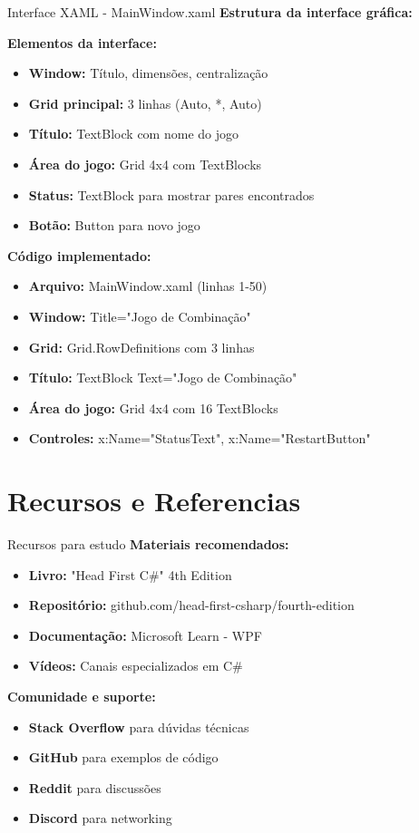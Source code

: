\documentclass[aspectratio=169]{beamer}
\begin{document}
\begin{frame}{Interface XAML - MainWindow.xaml}
\textbf{Estrutura da interface gráfica:}

\textbf{Elementos da interface:}
\begin{itemize}
    \item \textbf{Window:} Título, dimensões, centralização
    \item \textbf{Grid principal:} 3 linhas (Auto, *, Auto)
    \item \textbf{Título:} TextBlock com nome do jogo
    \item \textbf{Área do jogo:} Grid 4x4 com TextBlocks
    \item \textbf{Status:} TextBlock para mostrar pares encontrados
    \item \textbf{Botão:} Button para novo jogo
\end{itemize}

\textbf{Código implementado:}
\begin{itemize}
    \item \textbf{Arquivo:} MainWindow.xaml (linhas 1-50)
    \item \textbf{Window:} Title="Jogo de Combinação"
    \item \textbf{Grid:} Grid.RowDefinitions com 3 linhas
    \item \textbf{Título:} TextBlock Text="Jogo de Combinação"
    \item \textbf{Área do jogo:} Grid 4x4 com 16 TextBlocks
    \item \textbf{Controles:} x:Name="StatusText", x:Name="RestartButton"
\end{itemize}
\end{frame}



\section{Recursos e Referencias}

\begin{frame}{Recursos para estudo}
\textbf{Materiais recomendados:}
\begin{itemize}
    \item \textbf{Livro:} "Head First C\#" 4th Edition
    \item \textbf{Repositório:} github.com/head-first-csharp/fourth-edition
    \item \textbf{Documentação:} Microsoft Learn - WPF
    \item \textbf{Vídeos:} Canais especializados em C\#
\end{itemize}

\textbf{Comunidade e suporte:}
\begin{itemize}
    \item \textbf{Stack Overflow} para dúvidas técnicas
    \item \textbf{GitHub} para exemplos de código
    \item \textbf{Reddit} para discussões
    \item \textbf{Discord} para networking
\end{itemize}
\end{frame}
\end{document}
